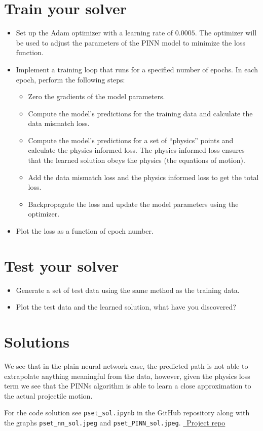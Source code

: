 \documentclass{article}
\begin{document}
\section{Train your solver}
\begin{itemize}
    \item Set up the Adam optimizer with a learning rate of $0.0005$. The optimizer will be used to adjust the parameters of the PINN model to minimize the loss function.
    \item Implement a training loop that runs for a specified number of epochs. In each epoch, perform the following steps:\begin{itemize}
        \item Zero the gradients of the model parameters.
        \item Compute the model's predictions for the training data and calculate the data mismatch loss.
        \item Compute the model's predictions for a set of “physics” points and calculate the physics-informed loss. The physics-informed loss ensures that the learned solution obeys the physics (the equations of motion).
        \item Add the data mismatch loss and the physics informed loss to get the total loss.
        \item Backpropagate the loss and update the model parameters using the optimizer.
    \end{itemize}
    \item Plot the loss as a function of epoch number.
\end{itemize}

\section{Test your solver}
\begin{itemize}
    \item Generate a set of test data using the same method as the training data.
    \item Plot the test data and the learned solution, what have you discovered?
\end{itemize}

\section{Solutions}

We see that in the plain neural network case, the predicted path is not able to extrapolate anything meaningful from the data, however, given the physics loss term we see that the PINNs algorithm is able to learn a close approximation to the actual projectile motion.

For the code solution see \texttt{pset\_sol.ipynb} in the GitHub repository along with the graphs \texttt{pset\_nn\_sol.jpeg} and \texttt{pset\_PINN\_sol.jpeg}. \href{https://github.com/PhoenixTamaoki/ML-OP}{\raisebox{-0.05\height}\faGithub\ Project repo}
\end{document}
